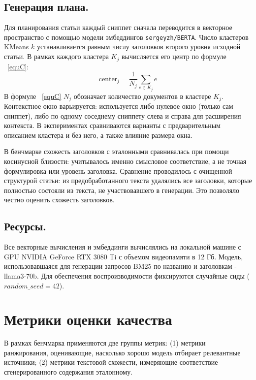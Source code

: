 \documentclass{article}
\theoremstyle{definition}
\theoremstyle{plain}
\begin{document}
\subsection*{Генерация плана.}
Для планирования статьи каждый сниппет сначала переводится в векторное пространство с помощью модели эмбеддингов \texttt{sergeyzh/BERTA}. 
Число кластеров KMeans \(k\) устанавливается равным числу заголовков второго уровня исходной статьи.  
В рамках каждого кластера $K_j$ вычисляется его центр по формуле ~\eqref{equC}:
\begin{equation}\label{equC}
\text{center}_j = \frac{1}{N_j} \sum_{e \in K_j} e
\end{equation}
В формуле ~\eqref{equC} $N_j$ обозначает количество документов в кластере $K_j$.
Контекстное окно варьируется: используется либо нулевое окно (только сам сниппет), либо по одному соседнему сниппету слева и справа для расширения контекста. 
В экспериментах сравниваются варианты с предварительным описанием кластера и без него, а также влияние размера окна. 

В бенчмарке схожесть заголовков с эталонными сравнивалась при помощи косинусной близости: учитывалось именно смысловое соответствие, а не точная формулировка или уровень заголовка. 
Сравнение проводилось с очищенной структурой статьи: из предобработанного текста удалялись все заголовки, которые полностью состояли из текста, не участвовавшего в генерации. 
Это позволяло честно оценить схожесть заголовков.

\subsection*{Ресурсы.}
Все векторные вычисления и эмбеддинги вычислялись на локальной машине с GPU NVIDIA GeForce RTX 3080 Ti с объемом видеопамяти в 12 Гб.
Модель, использовавшаяся для генерации запросов BM25 по названию и заголовкам - llama3-70b. 
Для обеспечения воспроизводимости фиксируются случайные сиды ($random\_seed = 42$).

\section*{Метрики оценки качества}

В рамках бенчмарка применяются две группы метрик:  
(1) метрики ранжирования, оценивающие, насколько хорошо модель отбирает релевантные источники;  
(2) метрики текстовой схожести, измеряющие соответствие сгенерированного содержания эталонному.
\end{document}
